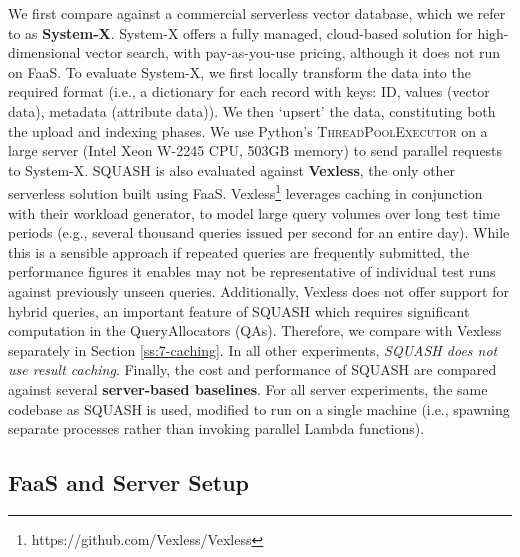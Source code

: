 We first compare against a commercial serverless vector database, which we refer to as \textbf{System-X}.
System-X offers a fully managed, cloud-based solution for high-dimensional vector search, with pay-as-you-use pricing, although it does not run on FaaS. 
To evaluate System-X, we first 
locally transform the data into the required format (i.e., a dictionary for each record with keys: ID, values (vector data), metadata (attribute data)). 
We then `upsert' the data, constituting both the upload and indexing phases. 
We use Python's \textsc{ThreadPoolExecutor} on a large server (Intel Xeon W-2245 CPU, 503GB memory) to send parallel requests to System-X.
SQUASH is also evaluated against \textbf{Vexless}\cite{Su2024Vexless}, the only other serverless solution built using FaaS.
Vexless\footnote{https://github.com/Vexless/Vexless} leverages caching in conjunction with their workload generator, to model large query volumes over long test time periods (e.g., several thousand queries issued per second for an entire day). 
While this is a sensible approach if repeated queries are frequently submitted, the performance figures it enables may not be representative of individual test runs against previously unseen queries. 
Additionally, Vexless does not offer support for hybrid queries, an important feature of SQUASH which requires significant computation in the QueryAllocators (QAs). 
Therefore, we compare with Vexless separately 
in Section \ref{ss:7-caching}. 
In all other experiments, \textit{SQUASH does not use result caching}.
Finally, the cost and performance of SQUASH are compared against several \textbf{server-based baselines}. 
For all server experiments, the same codebase as SQUASH is used, modified to run on a single machine (i.e., spawning separate processes rather than invoking parallel Lambda functions).

% 

\subsection{FaaS and Server Setup}

